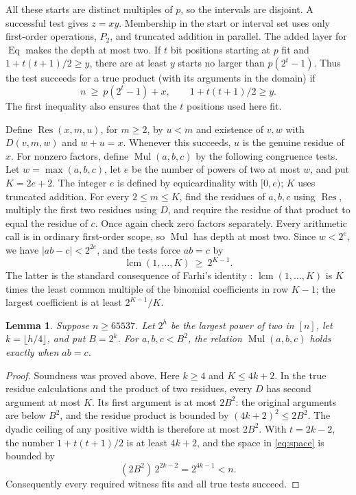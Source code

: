 \documentclass[11pt]{article}
\newtheorem{lemma}[theorem]{Lemma}
\newcommand{\Eq}{\operatorname{Eq}}
\newcommand{\Mul}{\operatorname{Mul}}
\newcommand{\Res}{\operatorname{Res}}
\begin{document}
All these starts are distinct multiples of \(p\), so the intervals
are disjoint. A successful test gives \(z=xy\). Membership in
the start or interval set uses only first-order operations,
\(P_2\), and truncated addition in parallel. The added layer
for \(\Eq\) makes the depth at most two. If \(t\) bit positions
starting at \(p\) fit and \(1+t(t+1)/2\geq y\), there are
at least \(y\) starts no larger than \(p(2^t-1)\). Thus the
test succeeds for a true product (with its arguments in the
domain) if
\[
 n\ \geq\ p(2^t-1)+x,\qquad 1+t(t+1)/2\geq y.
 \tag{1}\label{eq:space}
\]
The first inequality also ensures that the \(t\) positions used here
fit.

Define \(\Res(x,m,u)\), for \(m\geq2\), by \(u<m\) and
existence of \(v,w\) with \(D(v,m,w)\) and \(w+u=x\).
Whenever this succeeds, \(u\) is the genuine residue of \(x\).
For nonzero factors, define \(\Mul(a,b,c)\) by the following
congruence tests. Let \(w=\max(a,b,c)\), let \(e\) be the number
of powers of two at most \(w\), and put \(K=2e+2\).
The integer \(e\) is defined by equicardinality with \([0,e)\);
\(K\) uses truncated addition. For every \(2\leq m\leq K\),
find the residues of \(a,b,c\) using \(\Res\), multiply the
first two residues using \(D\), and require the residue of that
product to equal the residue of \(c\). Once again check zero
factors separately. Every arithmetic call is in ordinary
first-order scope, so \(\Mul\) has depth at most two.
Since \(w<2^e\), we have \(|ab-c|<2^{2e}\), and the tests force
\(ab=c\) by
\[
 \operatorname{lcm}(1,\ldots,K)\ \geq\ 2^{K-1}.
\]
The latter is the standard consequence of Farhi's identity
\cite[Theorem~1]{farhi}: \(\operatorname{lcm}(1,\ldots,K)\) is
\(K\) times the least common multiple of the binomial coefficients
in row \(K-1\); the largest coefficient is at least \(2^{K-1}/K\).

\begin{lemma}\label{lem:small}
Suppose \(n\geq65537\). Let \(2^h\) be the largest power of two in
\([n]\), let \(k=\lfloor h/4\rfloor\), and put \(B=2^k\).
For \(a,b,c<B^2\), the relation \(\Mul(a,b,c)\) holds exactly
when \(ab=c\).
\end{lemma}
\begin{proof}
Soundness was proved above. Here \(k\geq4\) and \(K\leq4k+2\).
In the true residue calculations and the product of two residues,
every \(D\) has second argument at most \(K\). Its first argument
is at most \(2B^2\): the original arguments are below \(B^2\), and
the residue product is bounded by \((4k+2)^2\leq2B^2\).
The dyadic ceiling of any positive width is therefore at most
\(2B^2\). With \(t=2k-2\), the number \(1+t(t+1)/2\) is at least
\(4k+2\), and the space in \eqref{eq:space} is bounded by
\[
 (2B^2)\,2^{2k-2}=2^{4k-1}<n.
\]
Consequently every required witness fits and all true tests succeed.
\end{proof}
\end{document}
